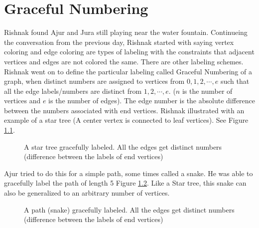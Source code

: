 \chapter{Graceful Numbering}

Rishnak found Ajur and Jura still playing near the water fountain. Continueing the conversation from the previous day, Rishnak started with saying vertex coloring and edge coloring are types of labeling with the constraints that adjacent vertices and edges are not colored the same. There are other labeling schemes. Rishnak went on to define the particular labeling called Graceful Numbering of a graph, when distinct numbers are assigned to vertices  from $0, 1,2, \cdots, e$ such that all the edge labels/numbers are distinct from $1,2, \cdots, e$. ($n$ is the number of vertices and $e$ is the number of edges). The edge number is the absolute difference between the numbers associated with end vertices.
Rishnak illustrated with an example of a star tree (A center vertex is connected to leaf vertices). See Figure \ref{19g1}.

\begin{figure}
\begin{center}
\caption{A star tree gracefully labeled. All the edges get distinct numbers (difference between the labels of end vertices)}\label{19g1}
\end{center}
\end{figure}
Ajur tried to do this for a simple path, some times called a snake. He was able to gracefully label the path of length 5 Figure \ref{19g2}. Like a Star tree, this snake can also be generalized to an arbitrary number of vertices.

\begin{figure}
\begin{center}
\caption{A path (snake) gracefully labeled. All the edges get distinct numbers (difference between the labels of end vertices)}\label{19g2}
\end{center}
\end{figure}

